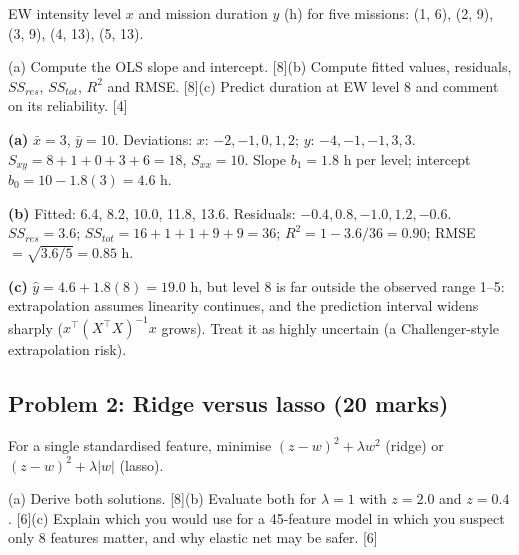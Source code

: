 \documentclass[11pt]{article}
\begin{document}
\begin{prob}EW intensity level $x$ and mission duration $y$ (h) for five missions: (1, 6), (2, 9), (3, 9), (4, 13), (5, 13).

(a) Compute the OLS slope and intercept. [8]\newline (b) Compute fitted values, residuals, $SS_{res}$, $SS_{tot}$, $R^2$ and RMSE. [8]\newline (c) Predict duration at EW level 8 and comment on its reliability. [4]\end{prob}

\begin{soln}\textbf{(a)} $\bar x=3$, $\bar y=10$. Deviations: $x$: $-2,-1,0,1,2$; $y$: $-4,-1,-1,3,3$. $S_{xy}=8+1+0+3+6=18$, $S_{xx}=10$. Slope $b_1=1.8$ h per level; intercept $b_0=10-1.8(3)=\mathbf{4.6}$ h.

\textbf{(b)} Fitted: 6.4, 8.2, 10.0, 11.8, 13.6. Residuals: $-0.4, 0.8, -1.0, 1.2, -0.6$. $SS_{res}=3.6$; $SS_{tot}=16+1+1+9+9=36$; $R^2=1-3.6/36=\mathbf{0.90}$; RMSE $=\sqrt{3.6/5}=\mathbf{0.85}$ h.

\textbf{(c)} $\hat y=4.6+1.8(8)=19.0$ h, but level 8 is far outside the observed range 1--5: extrapolation assumes linearity continues, and the prediction interval widens sharply ($x^\top(X^\top X)^{-1}x$ grows). Treat it as highly uncertain (a Challenger-style extrapolation risk).\end{soln}

\subsection{Problem 2: Ridge versus lasso \normalfont\small\color{GreyN}(20 marks)}

\begin{prob}For a single standardised feature, minimise $(z-w)^2+\lambda w^2$ (ridge) or $(z-w)^2+\lambda|w|$ (lasso).

(a) Derive both solutions. [8]\newline (b) Evaluate both for $\lambda=1$ with $z=2.0$ and $z=0.4$. [6]\newline (c) Explain which you would use for a 45-feature model in which you suspect only 8 features matter, and why elastic net may be safer. [6]\end{prob}
\end{document}
